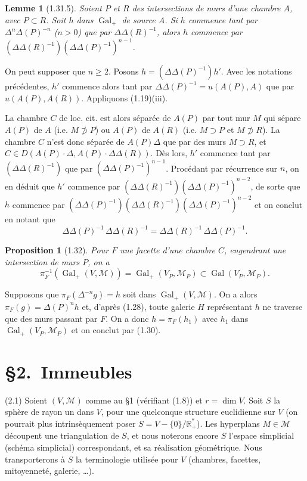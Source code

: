 \documentclass[12pt]{article}
\newtheorem{proposition}[theoreme]{Proposition}
\newtheorem{lemme}[theoreme]{Lemme}
\theoremstyle{remark}
\DeclareMathOperator{\Gal}{Gal}
\newcommand{\RR}{\mathbb{R}}
\begin{document}
\begin{lemme}[1.31.5]
Soient $P$ et $R$ des intersections de murs d'une chambre $A$, avec $P \subset R$. Soit $h$ dans $\Gal_+$ de source $A$. Si $h$ commence tant par $\Delta^n \Delta(P)^{-n}$ ($n > 0$) que par $\Delta \Delta(R)^{-1}$, alors $h$ commence par $(\Delta \Delta(R)^{-1})(\Delta \Delta(P)^{-1})^{n-1}$.
\end{lemme}

On peut supposer que $n \geq 2$. Posons $h = (\Delta \Delta(P)^{-1}) h'$. Avec les notations précédentes, $h'$ commence alors tant par $\Delta \Delta(P)^{-1} = u(A(P), A)$ que par $u(A(P), A(R))$. Appliquons (1.19)(iii).

La chambre $C$ de loc. cit. est alors séparée de $A(P)$ par tout mur $M$ qui sépare $A(P)$ de $A$ (i.e. $M \not\supset P$) ou $A(P)$ de $A(R)$ (i.e. $M \supset P$ et $M \not\supset R$). La chambre $C$ n'est donc séparée de $A(P) \Delta$ que par des murs $M \supset R$, et $C \in D(A(P) \cdot \Delta, A(P) \cdot \Delta \Delta(R))$. Dès lors, $h'$ commence tant par $(\Delta \Delta(R)^{-1})$ que par $(\Delta \Delta(P)^{-1})^{n-1}$. Procédant par récurrence sur $n$, on en déduit que $h'$ commence par $(\Delta \Delta(R)^{-1})(\Delta \Delta(P)^{-1})^{n-2}$, de sorte que $h$ commence par $(\Delta \Delta(P)^{-1})(\Delta \Delta(R)^{-1})(\Delta \Delta(P)^{-1})^{n-2}$ et on conclut en notant que
\[\Delta \Delta(P)^{-1} \, \Delta \Delta(R)^{-1} = \Delta \Delta(R)^{-1} \, \Delta \Delta(P)^{-1}.\]

\begin{proposition}[1.32]
Pour $F$ une facette d'une chambre $C$, engendrant une intersection de murs $P$, on a
\[\pi_F^{-1}(\Gal_+(V, \mathcal{M})) = \Gal_+(V_P, \mathcal{M}_P) \subset \Gal(V_P, \mathcal{M}_P).\]
\end{proposition}

Supposons que $\pi_F(\Delta^{-n} g) = h$ soit dans $\Gal_+(V, \mathcal{M})$. On a alors $\pi_F(g) = \Delta(P)^n h$ et, d'après (1.28), toute galerie $H$ représentant $h$ ne traverse que des murs passant par $F$. On a donc $h = \pi_F(h_1)$ avec $h_1$ dans $\Gal_+(V_P, \mathcal{M}_P)$ et on conclut par (1.30).

\section*{\S 2.~Immeubles}

(2.1) Soient $(V, \mathcal{M})$ comme au \S 1 (vérifiant (1.8)) et $r = \dim V$. Soit $S$ la sphère de rayon un dans $V$, pour une quelconque structure euclidienne sur $V$ (on pourrait plus intrinsèquement poser $S = V - \{0\}/\RR^*_+$). Les hyperplans $M \in \mathcal{M}$ découpent une triangulation de $S$, et nous noterons encore $S$ l'espace simplicial (schéma simplicial) correspondant, et sa réalisation géométrique. Nous transporterons à $S$ la terminologie utilisée pour $V$ (chambres, facettes, mitoyenneté, galerie, \ldots).
\end{document}

